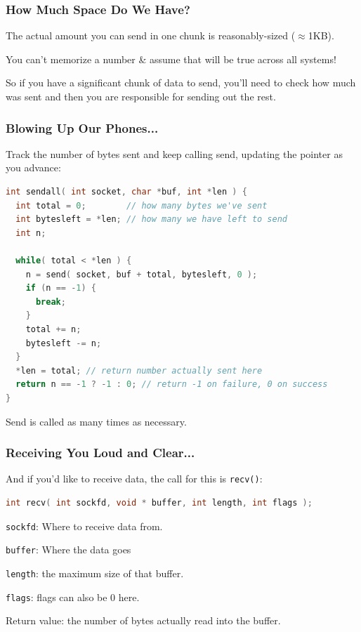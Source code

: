 \begin{frame}
	\frametitle{How Much Space Do We Have?}

	The actual amount you can send in one chunk is reasonably-sized ($\approx$1KB).

	You can't memorize a number \& assume that will be true across all systems!

	So if you have a significant chunk of data to send, you'll need to check how much was sent and then you are responsible for sending out the rest.

\end{frame}



\begin{frame}[fragile]
	\frametitle{Blowing Up Our Phones...}

	Track the number of bytes sent and keep calling send, updating the pointer as you advance:

	\begin{lstlisting}[language=C]
int sendall( int socket, char *buf, int *len ) {
  int total = 0;        // how many bytes we've sent
  int bytesleft = *len; // how many we have left to send
  int n;

  while( total < *len ) {
    n = send( socket, buf + total, bytesleft, 0 );
    if (n == -1) { 
      break; 
    }
    total += n;
    bytesleft -= n;
  }
  *len = total; // return number actually sent here
  return n == -1 ? -1 : 0; // return -1 on failure, 0 on success
}
\end{lstlisting}

	Send is called as many times as necessary.

\end{frame}



\begin{frame}[fragile]
	\frametitle{Receiving You Loud and Clear...}

	And if you'd like to receive data, the call for this is \texttt{recv()}:

	\begin{lstlisting}[language=C]
int recv( int sockfd, void * buffer, int length, int flags );
\end{lstlisting}

	\texttt{sockfd}: Where to receive data from.

	\texttt{buffer}: Where the data goes

	\texttt{length}: the maximum size of that buffer.

	\texttt{flags}: flags can also be 0 here.

	Return value: the number of bytes actually read into the buffer.

\end{frame}

